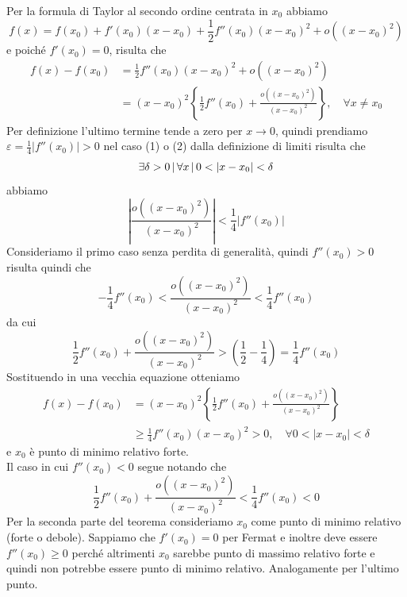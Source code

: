 \documentclass[a4paper]{article}
\begin{document}
\begin{snippetproof}{}
    Per la formula di Taylor al secondo ordine centrata in \(x_0\) abbiamo
    \[
        f(x) = f(x_0) + f'(x_0)(x-x_0) + \frac{1}{2}f''(x_0){(x-x_0)}^2 + o({(x-x_0)}^2)
    \]
    e poiché \(f'(x_0) = 0\), risulta che
    \begin{align*}
        f(x) - f(x_0) &= \frac{1}{2}f''(x_0){(x-x_0)}^2 + o({(x-x_0)}^2) \\
        &= {(x-x_0)}^2 \left\{
            \frac{1}{2} f''(x_0) + \frac{o({(x-x_0)}^2)}{{(x-x_0)^2}}
        \right\}, \quad \forall x \neq x_0
    \end{align*}
    Per definizione l'ultimo termine tende a zero per \(x\to 0\), quindi
    prendiamo \(\varepsilon = \frac{1}{4}|f''(x_0)| > 0\)
    nel caso (1) o (2) dalla definizione di limiti risulta che
    \[
        \exists \delta > 0 \,|\,
        \forall x \,|\, 0 < |x-x_0| < \delta
    \]
    abbiamo
    \[
        \left|\frac{o({(x-x_0)}^2)}{{(x-x_0)^2}}\right| < \frac{1}{4} |f''(x_0)|
    \]
    Consideriamo il primo caso senza perdita di generalità, quindi \(f''(x_0) > 0\) risulta quindi
    che
    \[
        -\frac{1}{4} f''(x_0) < \frac{o({(x-x_0)}^2)}{{(x-x_0)^2}} < \frac{1}{4}f''(x_0)
    \]
    da cui
    \[
        \frac{1}{2}f''(x_0) + \frac{o({(x-x_0)}^2)}{{(x-x_0)^2}} > \left(\frac{1}{2} - \frac{1}{4}\right)
        = \frac{1}{4}f''(x_0)
    \]
    Sostituendo in una vecchia equazione otteniamo
    \begin{align*}
        f(x) - f(x_0) &= {(x-x_0)}^2 \left\{\frac{1}{2} f''(x_0) + \frac{o({(x-x_0)}^2)}{{(x-x_0)^2}}\right\} \\
        &\geq \frac{1}{4}f''(x_0) {(x-x_0)}^2 > 0, \quad \forall 0<|x-x_0|<\delta
    \end{align*}
    e \(x_0\) è punto di minimo relativo forte. \\
    Il caso in cui \(f''(x_0) < 0\) segue notando che
    \[
        \frac{1}{2} f''(x_0) + \frac{o({(x-x_0)}^2)}{{(x-x_0)^2}} < \frac{1}{4}f''(x_0) < 0
    \]
    Per la seconda parte del teorema consideriamo \(x_0\) come punto di minimo relativo (forte o debole).
    Sappiamo che \(f'(x_0) = 0\) per Fermat e inoltre deve essere \(f''(x_0) \geq 0\) perché altrimenti
    \(x_0\) sarebbe punto di massimo relativo forte e quindi non potrebbe essere punto di minimo relativo.
    Analogamente per l'ultimo punto.
\end{snippetproof}
\end{document}
